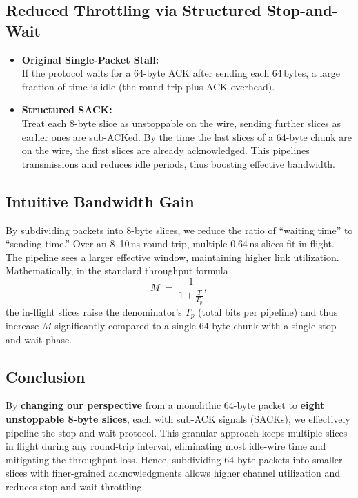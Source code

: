 \documentclass[../../../OAE-SPEC-MAIN.tex]{subfiles}
\begin{document}
\subsection{Reduced Throttling via Structured Stop-and-Wait}

\begin{itemize}
\item \textbf{Original Single-Packet Stall:}\\
If the protocol waits for a 64-byte ACK after sending each 64\,bytes, a large fraction of time is idle (the round-trip plus ACK overhead).

\item \textbf{Structured SACK:}\\
Treat each 8-byte slice as unstoppable on the wire, sending further slices as earlier ones are sub-ACKed.  By the time the last slices of a 64-byte chunk are on the wire, the first slices are already acknowledged. This pipelines transmissions and reduces idle periods, thus boosting effective bandwidth.
\end{itemize}


\subsection{Intuitive Bandwidth Gain}

By subdividing packets into 8-byte slices, we reduce the ratio of ``waiting time'' to ``sending time.'' Over an 8--10\,ns round-trip, multiple 0.64\,ns slices fit in flight.  The pipeline sees a larger effective window, maintaining higher link utilization.  Mathematically, in the standard throughput formula 
\[
M \;=\; \frac{1}{1 + \frac{T}{T_p}},
\]
the in-flight slices raise the denominator's $T_p$ (total bits per pipeline) and thus increase $M$ significantly compared to a single 64-byte chunk with a single stop-and-wait phase.


\subsection{Conclusion}

By \textbf{changing our perspective} from a monolithic 64-byte packet to \textbf{eight unstoppable 8-byte slices}, each with sub-ACK signals (SACKs), we effectively pipeline the stop-and-wait protocol. This granular approach keeps multiple slices in flight during any round-trip interval, eliminating most idle-wire time and mitigating the throughput loss. Hence, subdividing 64-byte packets into smaller slices with finer-grained acknowledgments allows higher channel utilization and reduces stop-and-wait throttling.
\end{document}
